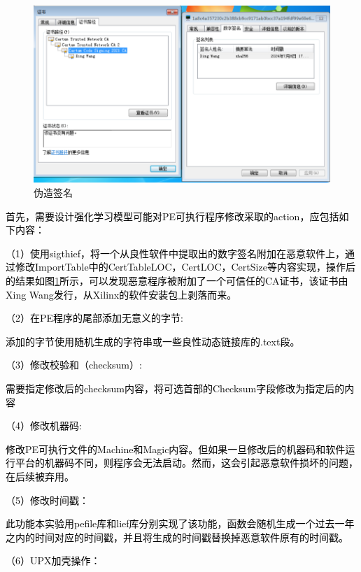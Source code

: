 \begin{figure}[htbp]
  \centering
  \includegraphics[]{images/certification_fabrication.png}
  \caption{伪造签名}\label{fig:certification_fabrication}
\end{figure}

\textcolor{black}{首先，需要设计强化学习模型可能对PE可执行程序修改采取的action，应包括如下内容：}

\textcolor{black}{（1）使用sigthief，将一个从良性软件中提取出的数字签名附加在恶意软件上，通过修改ImportTable中的CertTableLOC，CertLOC，CertSize等内容实现，操作后的结果如图\ref{fig:certification_fabrication}所示，可以发现恶意程序被附加了一个可信任的CA证书，该证书由Xing Wang发行，从Xilinx的软件安装包上剥落而来。}

\textcolor{black}{（2）在PE程序的尾部添加无意义的字节:}

\textcolor{black}{添加的字节使用随机生成的字符串或一些良性动态链接库的.text段。}

\textcolor{black}{（3）修改校验和（checksum）:}

\textcolor{black}{需要指定修改后的checksum内容，将可选首部的Checksum字段修改为指定后的内容}

\textcolor{black}{（4）修改机器码:}

\textcolor{black}{修改PE可执行文件的Machine和Magic内容。但如果一旦修改后的机器码和软件运行平台的机器码不同，则程序会无法启动。然而，这会引起恶意软件损坏的问题，在后续被弃用。}

\textcolor{black}{（5）修改时间戳：}

\textcolor{black}{此功能本实验用pefile库和lief库分别实现了该功能，函数会随机生成一个过去一年之内的时间对应的时间戳，并且将生成的时间戳替换掉恶意软件原有的时间戳。}

\textcolor{black}{（6）UPX加壳操作：}

